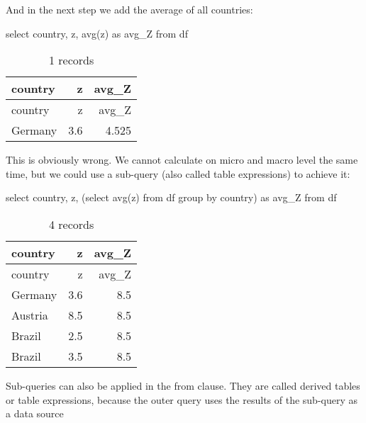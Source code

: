 \documentclass[
  letterpaper,
  DIV=11,
  numbers=noendperiod]{scrreprt}
\newenvironment{Shaded}{\begin{snugshade}}{\end{snugshade}}
\newcommand{\FunctionTok}[1]{\textcolor[rgb]{0.28,0.35,0.67}{#1}}
\newcommand{\KeywordTok}[1]{\textcolor[rgb]{0.00,0.23,0.31}{#1}}
\newcommand{\NormalTok}[1]{\textcolor[rgb]{0.00,0.23,0.31}{#1}}
\begin{document}
And in the next step we add the average of all countries:

\begin{Shaded}
\begin{Highlighting}[]
\KeywordTok{select}\NormalTok{ country, z, }\FunctionTok{avg}\NormalTok{(z) }\KeywordTok{as}\NormalTok{ avg\_Z }\KeywordTok{from}\NormalTok{ df}
\end{Highlighting}
\end{Shaded}

\begin{longtable}[]{@{}lrr@{}}
\caption{1 records}\tabularnewline
\toprule()
country & z & avg\_Z \\
\midrule()
\endfirsthead
\toprule()
country & z & avg\_Z \\
\midrule()
\endhead
Germany & 3.6 & 4.525 \\
\bottomrule()
\end{longtable}

This is obviously wrong. We cannot calculate on micro and macro level
the same time, but we could use a sub-query (also called table
expressions) to achieve it:

\begin{Shaded}
\begin{Highlighting}[]
\KeywordTok{select}\NormalTok{ country, z, (}\KeywordTok{select} \FunctionTok{avg}\NormalTok{(z) }\KeywordTok{from}\NormalTok{ df }\KeywordTok{group} \KeywordTok{by}\NormalTok{ country) }\KeywordTok{as}\NormalTok{ avg\_Z }\KeywordTok{from}\NormalTok{ df}
\end{Highlighting}
\end{Shaded}

\begin{longtable}[]{@{}lrr@{}}
\caption{4 records}\tabularnewline
\toprule()
country & z & avg\_Z \\
\midrule()
\endfirsthead
\toprule()
country & z & avg\_Z \\
\midrule()
\endhead
Germany & 3.6 & 8.5 \\
Austria & 8.5 & 8.5 \\
Brazil & 2.5 & 8.5 \\
Brazil & 3.5 & 8.5 \\
\bottomrule()
\end{longtable}

Sub-queries can also be applied in the from clause. They are called
derived tables or table expressions, because the outer query uses the
results of the sub-query as a data source
\end{document}
